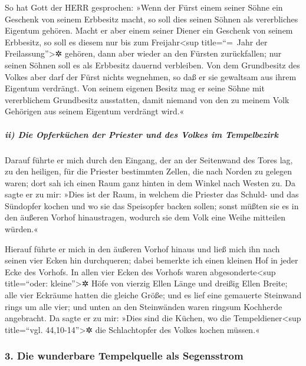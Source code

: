 So hat Gott der HERR gesprochen: »Wenn der Fürst einem
seiner Söhne ein Geschenk von seinem Erbbesitz macht, so soll dies
seinen Söhnen als vererbliches Eigentum gehören. Macht er
aber einem seiner Diener ein Geschenk von seinem Erbbesitz, so soll es
diesem nur bis zum Freijahr\textless sup title=``=~Jahr der
Freilassung''\textgreater✲ gehören, dann aber wieder an den Fürsten
zurückfallen; nur seinen Söhnen soll es als Erbbesitz dauernd
verbleiben. Von dem Grundbesitz des Volkes aber darf der
Fürst nichts wegnehmen, so daß er sie gewaltsam aus ihrem Eigentum
verdrängt. Von seinem eigenen Besitz mag er seine Söhne mit vererblichem
Grundbesitz ausstatten, damit niemand von den zu meinem Volk Gehörigen
aus seinem Eigentum verdrängt wird.«

\hypertarget{ii-die-opferkuxfcchen-der-priester-und-des-volkes-im-tempelbezirk}{%
\subparagraph{ii) Die Opferküchen der Priester und des Volkes im
Tempelbezirk}\label{ii-die-opferkuxfcchen-der-priester-und-des-volkes-im-tempelbezirk}}

Darauf führte er mich durch den Eingang, der an der
Seitenwand des Tores lag, zu den heiligen, für die Priester bestimmten
Zellen, die nach Norden zu gelegen waren; dort sah ich einen Raum ganz
hinten in dem Winkel nach Westen zu. Da sagte er zu mir:
»Dies ist der Raum, in welchem die Priester das Schuld- und das
Sündopfer kochen und wo sie das Speisopfer backen sollen; sonst müßten
sie es in den äußeren Vorhof hinaustragen, wodurch sie dem Volk eine
Weihe mitteilen würden.«

Hierauf führte er mich in den äußeren Vorhof hinaus und
ließ mich ihn nach seinen vier Ecken hin durchqueren; dabei bemerkte ich
einen kleinen Hof in jeder Ecke des Vorhofs. In allen
vier Ecken des Vorhofs waren abgesonderte\textless sup title=``oder:
kleine''\textgreater✲ Höfe von vierzig Ellen Länge und dreißig Ellen
Breite; alle vier Eckräume hatten die gleiche Größe; und
es lief eine gemauerte Steinwand rings um alle vier; und unten an den
Steinwänden waren ringsum Kochherde angebracht. Da sagte
er zu mir: »Dies sind die Küchen, wo die Tempeldiener\textless sup
title=``vgl. 44,10-14''\textgreater✲ die Schlachtopfer des Volkes kochen
müssen.«

\hypertarget{die-wunderbare-tempelquelle-als-segensstrom}{%
\subsubsection{3. Die wunderbare Tempelquelle als
Segensstrom}\label{die-wunderbare-tempelquelle-als-segensstrom}}

